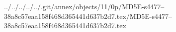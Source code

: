 ../../../../../.git/annex/objects/11/0p/MD5E-s4477--38a8c57eaa158f468d365441d637b2d7.tex/MD5E-s4477--38a8c57eaa158f468d365441d637b2d7.tex